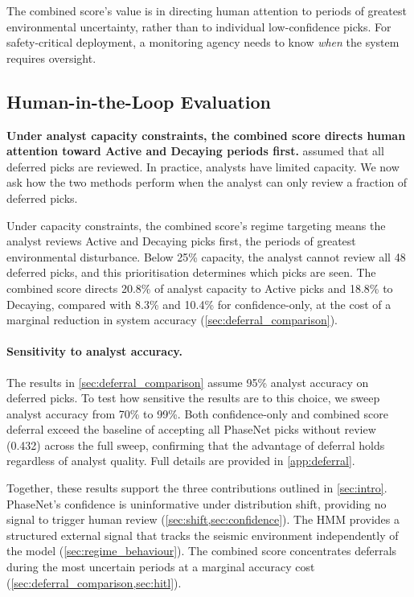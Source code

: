 \medskip
The combined score's value is in directing human attention to periods of greatest environmental uncertainty, rather than to individual low-confidence picks. For safety-critical deployment, a monitoring agency needs to know \emph{when} the system requires oversight.

\subsection{Human-in-the-Loop Evaluation}
\label{sec:hitl}

\textbf{Under analyst capacity constraints, the combined score directs human attention toward Active and Decaying periods first.}  assumed that all deferred picks are reviewed. In practice, analysts have limited capacity. We now ask how the two methods perform when the analyst can only review a fraction of deferred picks.

\medskip
Under capacity constraints, the combined score's regime targeting means the analyst reviews Active and Decaying picks first, the periods of greatest environmental disturbance. Below 25\% capacity, the analyst cannot review all 48 deferred picks, and this prioritisation determines which picks are seen. The combined score directs 20.8\% of analyst capacity to Active picks and 18.8\% to Decaying, compared with 8.3\% and 10.4\% for confidence-only, at the cost of a marginal reduction in system accuracy (\cref{sec:deferral_comparison}).

\paragraph{Sensitivity to analyst accuracy.} The results in \cref{sec:deferral_comparison} assume 95\% analyst accuracy on deferred picks. To test how sensitive the results are to this choice, we sweep analyst accuracy from 70\% to 99\%. Both confidence-only and combined score deferral exceed the baseline of accepting all PhaseNet picks without review (0.432) across the full sweep, confirming that the advantage of deferral holds regardless of analyst quality. Full details are provided in \cref{app:deferral}.

Together, these results support the three contributions outlined in \cref{sec:intro}. PhaseNet's confidence is uninformative under distribution shift, providing no signal to trigger human review (\cref{sec:shift,sec:confidence}). The HMM provides a structured external signal that tracks the seismic environment independently of the model (\cref{sec:regime_behaviour}). The combined score concentrates deferrals during the most uncertain periods at a marginal accuracy cost (\cref{sec:deferral_comparison,sec:hitl}).
